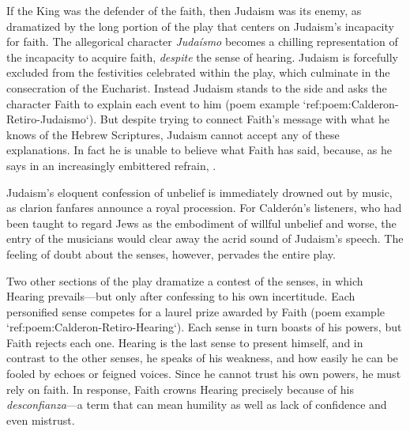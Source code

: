 If the King was the defender of the faith, then Judaism was its enemy, as dramatized by the long portion of the play that centers on Judaism's incapacity for faith.
The allegorical character \emph{Judaísmo} becomes a chilling representation of the incapacity to acquire faith, \emph{despite} the sense of hearing.
Judaism is forcefully excluded from the festivities celebrated within the play, which culminate in the consecration of the Eucharist.
Instead Judaism stands to the side and asks the character Faith to explain each event to him (poem example `ref:poem:Calderon-Retiro-Judaismo`).
But despite trying to connect Faith's message with what he knows of the Hebrew Scriptures, Judaism cannot accept any of these explanations.
In fact he is unable to believe what Faith has said, because, as he says in an increasingly embittered refrain, .


\label{poem:Calderon-Retiro-Judaismo}

Judaism's eloquent confession of unbelief is immediately drowned out by music, as clarion fanfares announce a royal procession.
For Calderón's listeners, who had been taught to regard Jews as the embodiment of willful unbelief and worse, the entry of the musicians would clear away the acrid sound of Judaism's speech.
The feeling of doubt about the senses, however, pervades the entire play.

Two other sections of the play dramatize a contest of the senses, in which Hearing prevails---but only after confessing to his own incertitude.
Each personified sense competes for a laurel prize awarded by Faith (poem example `ref:poem:Calderon-Retiro-Hearing`).
Each sense in turn boasts of his powers, but Faith rejects each one.
Hearing is the last sense to present himself, and in contrast to the other senses, he speaks of his weakness, and how easily he can be fooled by echoes or feigned voices.
Since he cannot trust his own powers, he must rely on faith.
In response, Faith crowns Hearing precisely because of his \emph{desconfianza}---a term that can mean humility as well as lack of confidence and even mistrust.


\label{poem:Calderon-Retiro-Hearing}

